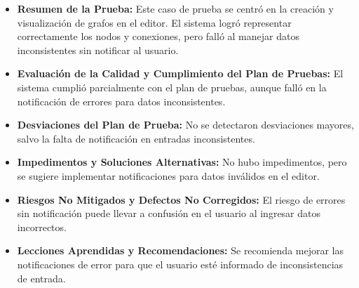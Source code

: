 \documentclass[stu, 12pt, letterpaper, donotrepeattitle, floatsintext, natbib]{apa7}
\begin{document}
\begin{itemize}
    \item \textbf{Resumen de la Prueba:} Este caso de prueba se centró en la creación y visualización de grafos en el editor. El sistema logró representar correctamente los nodos y conexiones, pero falló al manejar datos inconsistentes sin notificar al usuario.
    
    \item \textbf{Evaluación de la Calidad y Cumplimiento del Plan de Pruebas:} El sistema cumplió parcialmente con el plan de pruebas, aunque falló en la notificación de errores para datos inconsistentes.
    
    \item \textbf{Desviaciones del Plan de Prueba:} No se detectaron desviaciones mayores, salvo la falta de notificación en entradas inconsistentes.
    
    \item \textbf{Impedimentos y Soluciones Alternativas:} No hubo impedimentos, pero se sugiere implementar notificaciones para datos inválidos en el editor.
    
    \item \textbf{Riesgos No Mitigados y Defectos No Corregidos:} El riesgo de errores sin notificación puede llevar a confusión en el usuario al ingresar datos incorrectos.
    
    \item \textbf{Lecciones Aprendidas y Recomendaciones:} Se recomienda mejorar las notificaciones de error para que el usuario esté informado de inconsistencias de entrada.
\end{itemize}

\small %
\renewcommand{\arraystretch}{1.0} %
\setlength{\tabcolsep}{4pt} %
\end{document}
